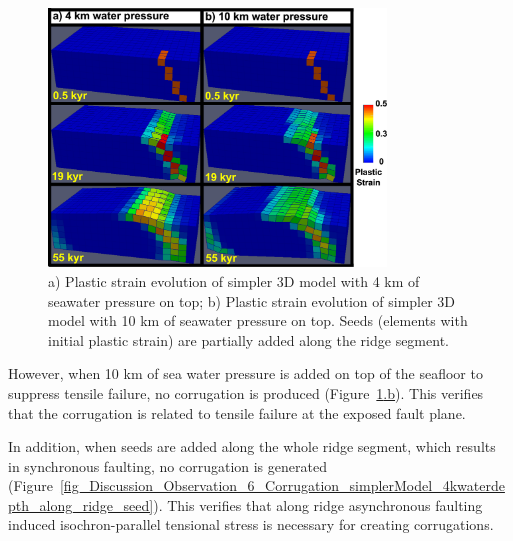 \begin{figure}[h]
  \centering
    \includegraphics[width=0.8\textwidth]{./Figures/fig_Discussion_simple_models_for_corrugation_mechanism.eps}
  \caption[Simpler 3D models for formation mechanism of corrugation.]{a) Plastic strain evolution of simpler 3D model with 4 km of seawater pressure on top; b) Plastic strain evolution of simpler 3D model with 10 km of seawater pressure on top. Seeds (elements with initial plastic strain) are partially added along the ridge segment.}
 \label{fig_Discussion_simple_models_for_corrugation_mechanism}
\end{figure}

However, when 10 km of sea water pressure is added on top of the seafloor to suppress tensile failure, no corrugation is produced (Figure~\hyperref[fig_Discussion_simple_models_for_corrugation_mechanism]{\ref{fig_Discussion_simple_models_for_corrugation_mechanism}.b}). This verifies that the corrugation is related to tensile failure at the exposed fault plane.

In addition, when seeds are added along the whole ridge segment, which results in synchronous faulting, no corrugation is generated (Figure~\hyperref[fig_Discussion_Observation_6_Corrugation_simplerModel_4kwaterdepth_along_ridge_seed]{\ref{fig_Discussion_Observation_6_Corrugation_simplerModel_4kwaterdepth_along_ridge_seed}}). This verifies that along ridge asynchronous faulting induced isochron-parallel tensional stress is necessary for creating corrugations.

